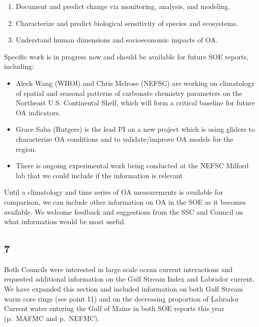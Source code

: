 \documentclass[
  10pt,
]{article}
\providecommand{\tightlist}{%
  \setlength{\itemsep}{0pt}\setlength{\parskip}{0pt}}
\begin{document}
\begin{enumerate}
\def\labelenumi{\arabic{enumi}.}
\tightlist
\item
  Document and predict change via monitoring, analysis, and modeling.\\
\item
  Characterize and predict biological sensitivity of species and
  ecosystems.\\
\item
  Understand human dimensions and socioeconomic impacts of OA.
\end{enumerate}

Specific work is in progress now and should be available for future SOE
reports, including:

\begin{itemize}
\tightlist
\item
  Aleck Wang (WHOI) and Chris Melrose (NEFSC) are working on climatology
  of spatial and seasonal patterns of carbonate chemistry parameters on
  the Northeast U.S. Continental Shelf, which will form a critical
  baseline for future OA indicators.
\item
  Grace Saba (Rutgers) is the lead PI on a new project which is using
  gliders to characterize OA conditions and to validate/improve OA
  models for the region.
\item
  There is ongoing experimental work being conducted at the NEFSC
  Milford lab that we could include if the information is relevant
\end{itemize}

Until a climatology and time series of OA measurements is available for
comparison, we can include other information on OA in the SOE as it
becomes available. We welcome feedback and suggestions from the SSC and
Council on what information would be most useful.

\hypertarget{section-6}{%
\subsection{7}\label{section-6}}

Both Councils were interested in large scale ocean current interactions
and requested additional information on the Gulf Stream Index and
Labrador current. We have expanded this section and included information
on both Gulf Stream warm core rings (see point 11) and on the decreasing
proportion of Labrador Current water entering the Gulf of Maine in both
SOE reports this year (p.~MAFMC and p.~NEFMC).
\end{document}
